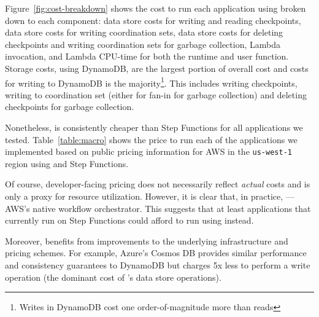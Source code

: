 Figure~\ref{fig:cost-breakdown} shows the cost to run each application using
\name{} broken down to each component: data store costs for writing and
reading checkpoints, data store costs for writing coordination sets, data
store costs for deleting checkpoints and writing coordination sets for garbage
collection, Lambda invocation, and Lambda CPU-time for both the \name{}
runtime and user function. Storage costs, using DynamoDB, are the largest
portion of overall cost and costs for writing to DynamoDB is the
majority\footnote{Writes in DynamoDB cost one order-of-magnitude more than
reads}. This includes writing checkpoints, writing to coordination set (either
for fan-in for garbage collection) and deleting checkpoints for garbage
collection.

Nonetheless, \name{} is consistently cheaper than Step Functions for all
applications we tested. Table~\ref{table:macro} shows the price to run each of
the applications we implemented based on public pricing information for AWS in
the \texttt{us-west-1} region using \name{} and Step Functions.

Of course, developer-facing pricing does not necessarily reflect \emph{actual}
costs and is only a proxy for resource utilization. However, it is clear that,
in practice, ---AWS's native workflow orchestrator. This suggests
that at least applications that currently run on Step Functions could afford
to run using \name{} instead.

Moreover, \name{} benefits from improvements to the underlying infrastructure
and pricing schemes. For example, Azure's Cosmos DB provides similar
performance and consistency guarantees to DynamoDB but charges 5x less to
perform a write operation (the dominant cost of \name{}'s data store
operations).



